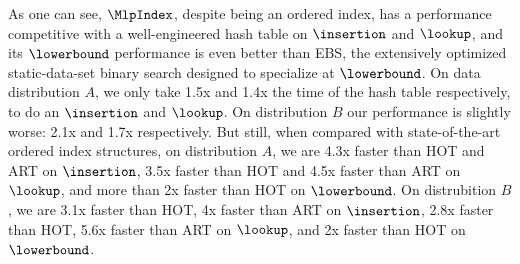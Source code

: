 \documentclass[11pt, usletter]{article}
\begin{document}
As one can see, $\MlpIndex$, despite being an ordered index, 
has a performance competitive with a well-engineered hash table on $\insertion$ and $\lookup$, 
and its $\lowerbound$ performance is even better than EBS, 
the extensively optimized static-data-set binary search designed to specialize at $\lowerbound$.
On data distribution $A$, we only take 1.5x and 1.4x the time of the hash table respectively, to do an $\insertion$ and $\lookup$. 
On distribution $B$ our performance is slightly worse: 2.1x and 1.7x respectively. 
But still, when compared with state-of-the-art ordered index structures, 
on distribution $A$, we are 4.3x faster than HOT and ART on $\insertion$, 
3.5x faster than HOT and 4.5x faster than ART on $\lookup$, 
and more than 2x faster than HOT on $\lowerbound$. 
On distrubition $B$, we are 3.1x faster than HOT, 4x faster than ART on $\insertion$, 
2.8x faster than HOT, 5.6x faster than ART on $\lookup$, 
and 2x faster than HOT on $\lowerbound$.
\end{document}
